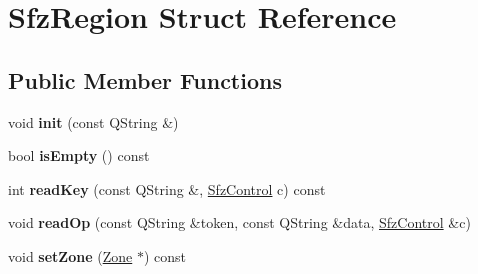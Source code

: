 \hypertarget{struct_sfz_region}{}\section{Sfz\+Region Struct Reference}
\label{struct_sfz_region}
\subsection*{Public Member Functions}
\begin{DoxyCompactItemize}
\item 
\mbox{\label{struct_sfz_region_a8f2030b012787a0d649d4e025ae30d24}} 
void {\bfseries init} (const Q\+String \&)
\item 
\mbox{\label{struct_sfz_region_af447c86a5e55e18aaa82bae46d0bf374}} 
bool {\bfseries is\+Empty} () const
\item 
\mbox{\label{struct_sfz_region_afbbc89fc62977858d69e42f1d6be3ac7}} 
int {\bfseries read\+Key} (const Q\+String \&, \hyperlink{struct_sfz_control}{Sfz\+Control} c) const
\item 
\mbox{\label{struct_sfz_region_a47d9f3b5d6b16729a42b75a363645960}} 
void {\bfseries read\+Op} (const Q\+String \&token, const Q\+String \&data, \hyperlink{struct_sfz_control}{Sfz\+Control} \&c)
\item 
\mbox{\label{struct_sfz_region_a7e96af0ad8434800741631297fb6bdaf}} 
void {\bfseries set\+Zone} (\hyperlink{struct_zone}{Zone} $\ast$) const
\end{DoxyCompactItemize}
